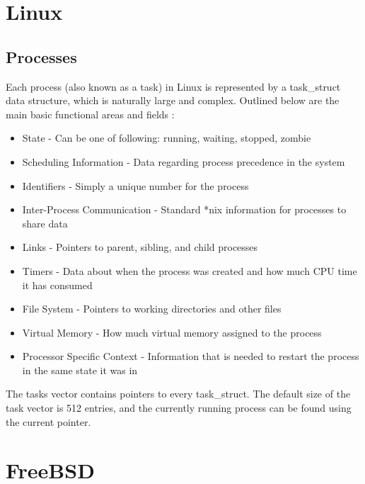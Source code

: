 \documentclass[letterpaper,draftclsnofoot,10pt,onecolumn,titlepage]{IEEEtran}\usepackage[margin=0.75in]{geometry}
\begin{document}
\section{Linux}
    \subsection{Processes}
    Each process (also known as a task) in Linux is represented by a task\_struct data structure, which is naturally
    large and complex. Outlined below are the main basic functional areas and fields \cite{linuxprocesses}:

    \begin{itemize}
        \item State - Can be one of following: running, waiting, stopped, zombie
        \item Scheduling Information - Data regarding process precedence in the system
        \item Identifiers - Simply a unique number for the process
        \item Inter-Process Communication - Standard *nix information for processes to share data
        \item Links - Pointers to parent, sibling, and child processes
        \item Timers - Data about when the process was created and how much CPU time it has consumed
        \item File System - Pointers to working directories and other files
        \item Virtual Memory - How much virtual memory assigned to the process
        \item Processor Specific Context - Information that is needed to restart the process in the same state it was in
    \end{itemize}

    The tasks vector contains pointers to every task\_struct. The default size of the task vector is 512 entries, and
    the currently running process can be found using the current pointer.

\section{FreeBSD}
\end{document}
